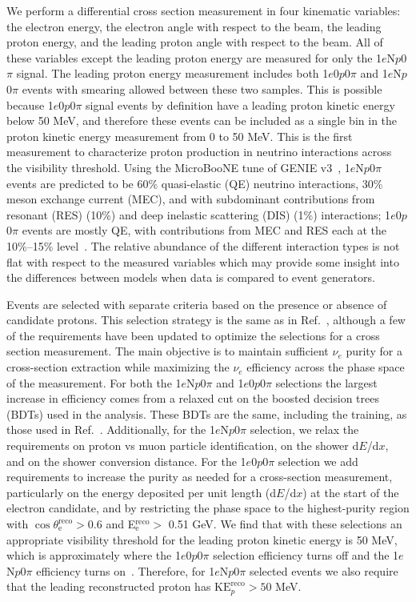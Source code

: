 \documentclass[reprint,
 amsmath,amssymb,
 aps,prd,
 superscriptaddress,
 twocolumn, longbibliography
]{revtex4-1}
\newcommand{\nue}{$\nu_e$\xspace}
\newcommand{\npsel}{1$e$N$p$0$\pi$\xspace}
\newcommand{\zpsel}{1$e$0$p$0$\pi$\xspace}
\newcommand{\dedx}{d$E$/d$x$\xspace}
\newcommand{\ke}{\ensuremath{\textrm{KE}\xspace}}
\begin{document}
We perform a differential cross section measurement in four kinematic variables: the electron energy, the electron angle with respect to the beam, the leading proton energy, and the leading proton angle with respect to the beam. 
All of these variables except the leading proton energy are measured for only the \npsel signal. The leading proton energy measurement includes both \zpsel and \npsel events with smearing allowed between these two samples. This is possible because \zpsel signal events by definition have a leading proton kinetic energy below 50 MeV, and therefore these events can be included as a single bin in the proton kinetic energy measurement from 0 to 50 MeV. This is the first measurement to characterize proton production in neutrino interactions across the visibility threshold.
Using the MicroBooNE tune of GENIE v3~\cite{ubtune}, \npsel events are predicted to be 60\% quasi-elastic (QE) neutrino interactions, 30\% meson exchange current (MEC), and with subdominant contributions from resonant (RES) (10\%) and deep inelastic scattering (DIS) (1\%) interactions; \zpsel events are mostly QE, with contributions from MEC and RES each at the 10\%--15\% level~\cite{Suppl}. The relative abundance of the different interaction types is not flat with respect to the measured variables which may provide some insight into the differences between models when data is compared to event generators.

Events are selected with separate criteria based on the presence or absence of candidate protons.  This selection strategy is the same as in Ref.~\cite{PeLEE}, although a few of the requirements have been updated to optimize the selections for a cross section measurement.  The main objective is to maintain sufficient \nue purity for a cross-section extraction while maximizing the \nue efficiency across the phase space of the measurement. For both the \npsel and \zpsel selections the largest increase in efficiency comes from a relaxed cut on the boosted decision trees (BDTs) used in the analysis.  These BDTs are the same, including the training, as those used in Ref.~\cite{PeLEE}. Additionally, for the \npsel selection, we relax the  requirements on proton vs muon particle identification, on the shower \dedx, and on the shower conversion distance. For the \zpsel selection we add requirements to increase the purity as needed for a cross-section measurement, particularly on the energy deposited per unit length (\dedx) at the start of the electron candidate, and by restricting the phase space to the highest-purity region with $\cos\theta_\textrm{e}^\textrm{reco}>0.6$ and E$_\textrm{e}^\textrm{reco} >$ 0.51 GeV. We find that with these selections an appropriate visibility threshold for the leading proton kinetic energy is 50 MeV, which is approximately where the \zpsel selection efficiency turns off and the \npsel efficiency turns on~\cite{Suppl}. Therefore, for \npsel selected events we also require that the leading reconstructed proton has $\ke_{p}^\textrm{reco} > 50$ MeV.
\end{document}
